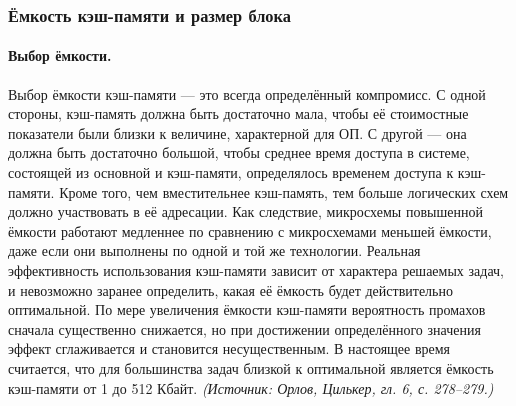 \documentclass[a4paper,12pt]{article}
\begin{document}
\subsubsection{Ёмкость кэш-памяти и размер блока}

\paragraph{Выбор ёмкости.}
Выбор ёмкости кэш-памяти --- это всегда определённый компромисс. С одной стороны, кэш-память должна быть достаточно мала, чтобы её стоимостные показатели были близки к величине, характерной для ОП. С другой --- она должна быть достаточно большой, чтобы среднее время доступа в системе, состоящей из основной и кэш-памяти, определялось временем доступа к кэш-памяти. Кроме того, чем вместительнее кэш-память, тем больше логических схем должно участвовать в её адресации. Как следствие, микросхемы повышенной ёмкости работают медленнее по сравнению с микросхемами меньшей ёмкости, даже если они выполнены по одной и той же технологии. Реальная эффективность использования кэш-памяти зависит от характера решаемых задач, и невозможно заранее определить, какая её ёмкость будет действительно оптимальной. По мере увеличения ёмкости кэш-памяти вероятность промахов сначала существенно снижается, но при достижении определённого значения эффект сглаживается и становится несущественным. В настоящее время считается, что для большинства задач близкой к оптимальной является ёмкость кэш-памяти от 1 до 512 Кбайт.
\textit{(Источник: Орлов, Цилькер, гл. 6, с. 278--279.)}
\end{document}
